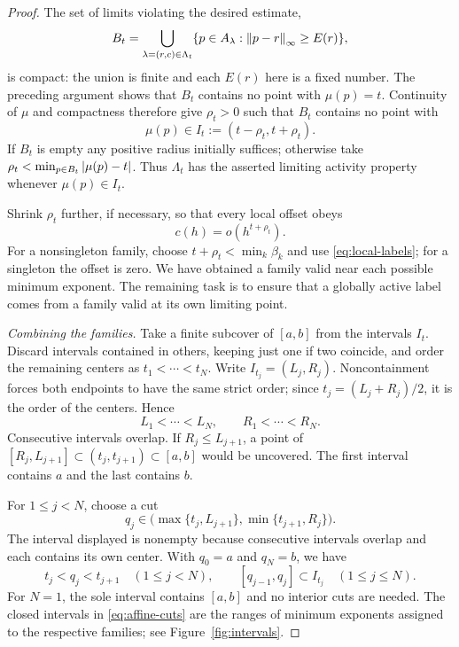\begin{proof}
The set of limits violating the desired estimate,
\[
 B_t=\bigcup_{\lambda=(r,c)\in\Lambda_t}
 \{p\in A_\lambda:\left\|p-r\right\|_\infty\geq E(r)\},
\]
is compact: the union is finite and each $E(r)$ here is a fixed number.
The preceding argument shows that $B_t$ contains no point with
$\mu(p)=t$. Continuity of $\mu$ and compactness therefore give
$\rho_t>0$ such that $B_t$ contains no point with
\[
 \mu(p)\in I_t:=(t-\rho_t,t+\rho_t).
\]
If $B_t$ is empty any positive radius initially suffices; otherwise take
$\rho_t<\min_{p\in B_t}\left|\mu(p)-t\right|$. Thus $\Lambda_t$
has the asserted limiting activity property whenever $\mu(p)\in I_t$.

Shrink $\rho_t$ further, if necessary, so that every local offset obeys
\begin{equation}
 c(h)=o(h^{t+\rho_t}).
 \label{eq:local-decay}
\end{equation}
For a nonsingleton family, choose $t+\rho_t<\min_k\beta_k$ and use
\eqref{eq:local-labels}; for a singleton the offset is zero.
We have obtained a family valid near each possible minimum exponent.
The remaining task is to ensure that a globally active label comes from
a family valid at its own limiting point.

\medskip
\noindent\emph{Combining the families.}
Take a finite subcover of $[a,b]$ from the intervals $I_t$. Discard
intervals contained in others, keeping just one if two coincide, and
order the remaining centers as $t_1<\cdots<t_N$. Write
$I_{t_j}=(L_j,R_j)$. Noncontainment forces both endpoints to have the
same strict order; since $t_j=(L_j+R_j)/2$, it is the order of the
centers. Hence
\[
 L_1<\cdots<L_N,\qquad R_1<\cdots<R_N.
\]
Consecutive intervals overlap. If $R_j\leq L_{j+1}$, a point of
$[R_j,L_{j+1}]\subset(t_j,t_{j+1})\subset[a,b]$ would be uncovered.
The first interval contains $a$ and the last contains $b$.

For $1\leq j<N$, choose a cut
\[
 q_j\in
 \bigl(\max\{t_j,L_{j+1}\},\min\{t_{j+1},R_j\}\bigr).
\]
The interval displayed is nonempty because consecutive intervals overlap
and each contains its own center. With $q_0=a$ and $q_N=b$, we have
\begin{equation}
 t_j<q_j<t_{j+1}\quad(1\leq j<N),
 \qquad [q_{j-1},q_j]\subset I_{t_j}\quad(1\leq j\leq N).
 \label{eq:affine-cuts}
\end{equation}
For $N=1$, the sole interval contains $[a,b]$ and no interior cuts are
needed. The closed intervals in \eqref{eq:affine-cuts} are the ranges
of minimum exponents assigned to the respective families; see
Figure~\ref{fig:intervals}.


\end{proof}
